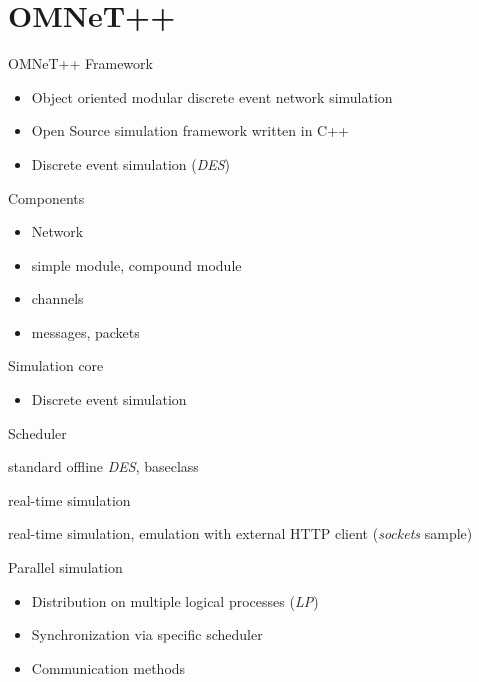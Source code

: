 \section{OMNeT++}
    
\begin{frame}{OMNeT++ Framework}
    \begin{itemize}
        \item Object oriented modular discrete event network simulation
        \item Open Source simulation framework written in C++
        \item Discrete event simulation (\emph{DES})
    \end{itemize}
    
    \begin{block}{Components}
        \begin{itemize}
            \item Network
            \item simple module, compound module
            \item channels
            \item messages, packets
        \end{itemize}
    \end{block}
\end{frame}

\begin{frame}{Simulation core}
    \begin{itemize}
        \item Discrete event simulation
    \end{itemize}
    
    \begin{block}{Scheduler}
        \begin{description}[cRealtimeScheduler]
            \item[cScheduler] standard offline \emph{DES}, baseclass
            \item[cRealtimeScheduler] real-time simulation
            \item[SocketRTScheduler] real-time simulation, emulation with external HTTP client (\emph{sockets} sample)
        \end{description}
    \end{block}
    
    \begin{block}{Parallel simulation}
        \begin{itemize}
            \item Distribution on multiple logical processes (\emph{LP})
            \item Synchronization via specific scheduler
            \item Communication methods
        \end{itemize}
    \end{block}
\end{frame}